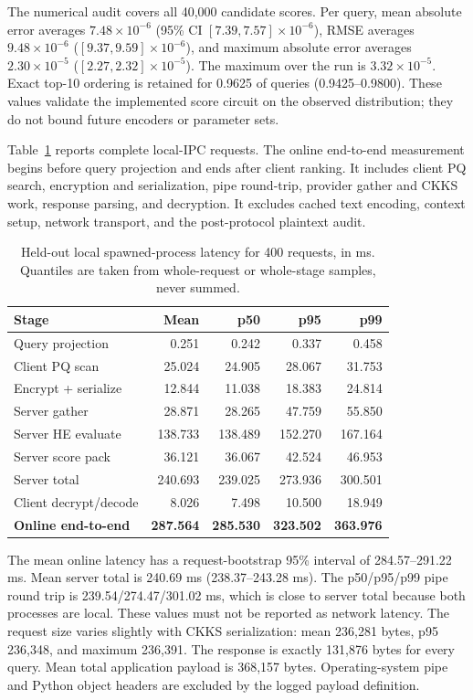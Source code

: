 \documentclass[pdflatex,sn-basic,Numbered]{sn-jnl}
\theoremstyle{plain}
\begin{document}
The numerical audit covers all 40,000 candidate scores. Per query, mean absolute error averages $7.48\times10^{-6}$ (95\% CI $[7.39,7.57]\times10^{-6}$), RMSE averages $9.48\times10^{-6}$ ($[9.37,9.59]\times10^{-6}$), and maximum absolute error averages $2.30\times10^{-5}$ ($[2.27,2.32]\times10^{-5}$). The maximum over the run is $3.32\times10^{-5}$. Exact top-10 ordering is retained for 0.9625 of queries (0.9425--0.9800). These values validate the implemented score circuit on the observed distribution; they do not bound future encoders or parameter sets.

Table~\ref{tab:unified-latency} reports complete local-IPC requests. The online end-to-end measurement begins before query projection and ends after client ranking. It includes client PQ search, encryption and serialization, pipe round-trip, provider gather and CKKS work, response parsing, and decryption. It excludes cached text encoding, context setup, network transport, and the post-protocol plaintext audit.

\begin{table}[t]
\caption{Held-out local spawned-process latency for 400 requests, in ms. Quantiles are taken from whole-request or whole-stage samples, never summed.}\label{tab:unified-latency}
\centering
\small
\begin{tabular}{@{}lrrrr@{}}
\toprule
Stage & Mean & p50 & p95 & p99 \\
\midrule
Query projection & 0.251 & 0.242 & 0.337 & 0.458 \\
Client PQ scan & 25.024 & 24.905 & 28.067 & 31.753 \\
Encrypt + serialize & 12.844 & 11.038 & 18.383 & 24.814 \\
Server gather & 28.871 & 28.265 & 47.759 & 55.850 \\
Server HE evaluate & 138.733 & 138.489 & 152.270 & 167.164 \\
Server score pack & 36.121 & 36.067 & 42.524 & 46.953 \\
Server total & 240.693 & 239.025 & 273.936 & 300.501 \\
Client decrypt/decode & 8.026 & 7.498 & 10.500 & 18.949 \\
\textbf{Online end-to-end} & \textbf{287.564} & \textbf{285.530} & \textbf{323.502} & \textbf{363.976} \\
\bottomrule
\end{tabular}
\end{table}

The mean online latency has a request-bootstrap 95\% interval of 284.57--291.22 ms. Mean server total is 240.69 ms (238.37--243.28 ms). The p50/p95/p99 pipe round trip is 239.54/274.47/301.02 ms, which is close to server total because both processes are local. These values must not be reported as network latency. The request size varies slightly with CKKS serialization: mean 236,281 bytes, p95 236,348, and maximum 236,391. The response is exactly 131,876 bytes for every query. Mean total application payload is 368,157 bytes. Operating-system pipe and Python object headers are excluded by the logged payload definition.
\end{document}
